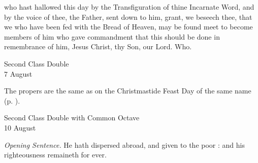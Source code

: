 
\postcommunion
{} who hast hallowed this day by the Transfiguration of thine Incarnate Word, and by the voice of thee, the Father, sent down to him, grant, we beseech thee, that we who have been fed with the Bread of Heaven, may be found meet to become members of him who gave commandment that this should be done in remembrance of him, Jesus Christ, thy Son, our Lord. Who.

\begin{inhead}
    {Second Class Double\\
7 August}
\end{inhead}
\begin{rubric}
    The propers are the same as on the Christmastide Feast Day of the same name (p. \pageref{MostHolyName}).
\end{rubric}

\begin{inhead}
    {Second Class Double with Common Octave\\
10 August}
\end{inhead}
\par\noindent
\textit{Opening Sentence.} He hath dispersed abroad, and given to the poor : and his righteousness remaineth for ever.%



